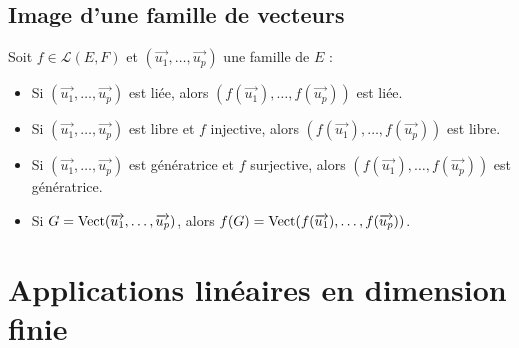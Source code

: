 \subsection{Image d'une famille de vecteurs}\label{subsec:image-d'une-famille-de-vecteurs}

Soit $f \in \mathcal{L}(E, F)$ et $(\vec{u_1}, \dots, \vec{u_p})$ une famille de $E$ :
\begin{itemize}
    \item Si $(\vec{u_1}, \dots, \vec{u_p})$ est liée, alors $(f(\vec{u_1}), \dots, f(\vec{u_p}))$ est liée.
    \item Si $(\vec{u_1}, \dots, \vec{u_p})$ est libre et $f$ injective, alors $(f(\vec{u_1}), \dots, f(\vec{u_p}))$ est libre.
    \item Si $(\vec{u_1}, \dots, \vec{u_p})$ est génératrice et $f$ surjective, alors $(f(\vec{u_1}), \dots, f(\vec{u_p}))$ est génératrice.
    \item Si $G = \operatorname{Vect}(\overrightarrow{u_1}, \dots, \overrightarrow{u_p})$, alors $f(G) = \operatorname{Vect}(f(\overrightarrow{u_1}), \dots, f(\overrightarrow{u_p}))$.
\end{itemize}


\section{Applications linéaires en dimension finie}\label{sec:applications-lineaires-en-dimension-finie}

